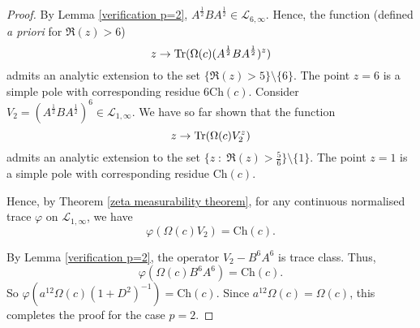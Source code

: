 \begin{proof}
        By Lemma \ref{verification p=2}, $A^{\frac12}BA^{\frac12}\in\mathcal{L}_{6,\infty}.$ Hence, the function (defined {\it a priori} for $\Re(z)>6$)
        $$z\to{\rm Tr}(\Omega(c)(A^{\frac12}BA^{\frac12})^z)$$
        admits an analytic extension to the set $\{\Re(z)>5\}\setminus\{6\}.$ The point $z=6$ is a simple pole with corresponding residue $6\mathrm{Ch}(c).$ Consider $V_2=(A^{\frac12}BA^{\frac12})^6\in\mathcal{L}_{1,\infty}.$ 
        We have so far shown that the function
        $$z\to{\rm Tr}(\Omega(c)V_2^z)$$
        admits an analytic extension to the set $\{z\;:\;\Re(z)>\frac56\}\setminus \{1\}.$ The point $z=1$ is a simple pole with corresponding residue $\mathrm{Ch}(c)$.
        
        Hence, by Theorem \ref{zeta measurability theorem}, for any continuous normalised trace $\varphi$ on $\mathcal{L}_{1,\infty}$, we have
        \begin{equation*}
            \varphi(\Omega(c)V_2) = \mathrm{Ch}(c).
        \end{equation*}
        
        By Lemma \ref{verification p=2}, the operator $V_2-B^6A^6$ is trace class. Thus,
        \begin{equation*}
            \varphi(\Omega(c)B^6A^6) = \mathrm{Ch}(c).
        \end{equation*}
        So $\varphi(a^{12}\Omega(c)(1+D^2)^{-1}) = \mathrm{Ch}(c)$. Since $a^{12}\Omega(c) = \Omega(c)$, this completes the proof for the case $p=2$.
    \end{proof}
